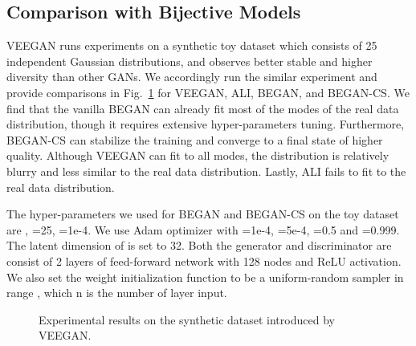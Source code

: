 \documentclass[runningheads]{llncs}
\begin{document}
    \subsection{Comparison with Bijective Models}
    \label{subsection:comparison-with-bijective}
    
    VEEGAN runs experiments on a synthetic toy dataset which consists of 25 independent Gaussian distributions, and observes better stable and higher diversity than other GANs. We accordingly run the similar experiment and provide comparisons in Fig.~\ref{Figure:VEEGAN-Toy-Result} for VEEGAN, ALI, BEGAN, and BEGAN-CS. We find that the vanilla BEGAN can already fit most of the modes of the real data distribution, though it requires extensive hyper-parameters tuning. Furthermore, BEGAN-CS can stabilize the training and converge to a final state of higher quality. Although VEEGAN can fit to all modes, the distribution is relatively blurry and less similar to the real data distribution. Lastly, ALI fails to fit to the real data distribution. 
    
    The hyper-parameters we used for BEGAN and BEGAN-CS on the toy dataset are , =25, =1e-4. We use Adam \cite{Adam} optimizer with =1e-4, =5e-4, =0.5 and =0.999. The latent dimension of  is set to 32. Both the generator and discriminator are consist of 2 layers of feed-forward network with 128 nodes and ReLU activation. We also set the weight initialization function to be a uniform-random sampler in range , which n is the number of layer input.
    
    \begin{figure}[!t]
        \centering
        \setlength{\tabcolsep}{4pt}
        \caption{Experimental results on the synthetic dataset introduced by VEEGAN.}
        \label{Figure:VEEGAN-Toy-Result}
        
    \end{figure}
    
\end{document}
